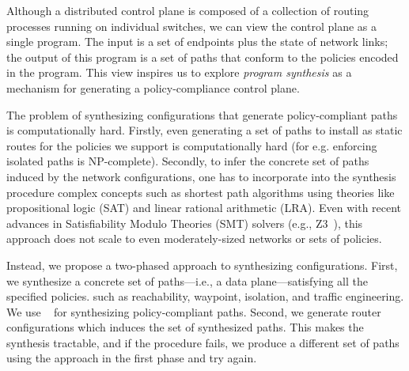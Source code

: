 Although a distributed control plane is composed of a collection of routing
processes running on individual switches, we can view the control plane as a
single program. The input is a set of endpoints plus the state of network
links; the output of this program is a set of paths that conform to the
policies encoded in the program. This view inspires us to explore {\em program
	synthesis} as a mechanism for generating a policy-compliance control plane.



The problem of synthesizing configurations 
that generate policy-compliant paths 
is computationally hard. 
Firstly, even generating a set of paths to install
as static routes for the policies we support is
computationally hard (for e.g. enforcing isolated
paths is NP-complete). 
Secondly, to infer the concrete
set of paths induced by the network configurations, 
one has to incorporate
into the synthesis procedure 
complex concepts such as shortest path algorithms
using theories like propositional logic (SAT) 
and linear rational
arithmetic (LRA). Even with recent 
advances in Satisfiability Modulo Theories
(SMT) solvers (e.g., Z3~\cite{z3}), 
this approach does not scale to
even moderately-sized networks or 
sets of policies.


Instead, we propose 
a two-phased approach to synthesizing configurations.
 First, we synthesize a concrete set of paths---i.e., 
 a data plane---satisfying  
all the specified policies.
such as reachability, waypoint, isolation, and
traffic engineering. We use  
\genesis~\cite{genesis} for
synthesizing policy-compliant paths. 
Second, we generate router configurations which
induces the set of synthesized paths. This makes the synthesis 
tractable, and if the procedure fails, we produce a different 
set of paths using the approach in the first phase 
and try again. 

